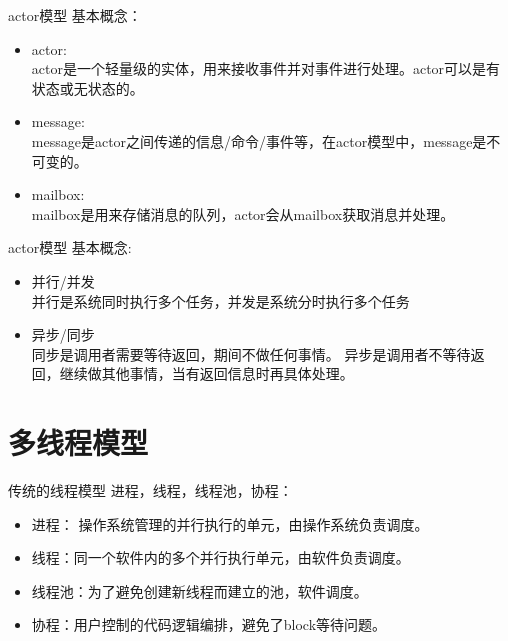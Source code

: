 \documentclass[UTF8]{ctexbeamer}
\begin{document}
\begin{frame}{actor模型}
  基本概念：
  \begin{itemize}
  \item actor:\\
    actor是一个轻量级的实体，用来接收事件并对事件进行处理。actor可以是有状态或无状态的。
  \item message:\\
    message是actor之间传递的信息/命令/事件等，在actor模型中，message是不可变的。
  \item mailbox:\\
    mailbox是用来存储消息的队列，actor会从mailbox获取消息并处理。
  \end{itemize}
\end{frame}

\begin{frame}{actor模型}
  基本概念: 
  \begin{itemize}
  \item 并行/并发 \\
    并行是系统同时执行多个任务，并发是系统分时执行多个任务
  \item 异步/同步 \\
    同步是调用者需要等待返回，期间不做任何事情。
    异步是调用者不等待返回，继续做其他事情，当有返回信息时再具体处理。
  \end{itemize}
\end{frame}

\section{多线程模型}
\frame{\tableofcontents[currentsection]} %

\begin{frame} {传统的线程模型}
  进程，线程，线程池，协程：
  \begin{itemize}
  \item 进程： 操作系统管理的并行执行的单元，由操作系统负责调度。
  \item 线程：同一个软件内的多个并行执行单元，由软件负责调度。
  \item 线程池：为了避免创建新线程而建立的池，软件调度。
  \item 协程：用户控制的代码逻辑编排，避免了block等待问题。
  \end{itemize}
\end{frame}
\end{document}
